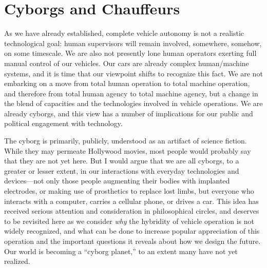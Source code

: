 \chapter{Cyborgs and Chauffeurs}

As we have already established, complete vehicle autonomy is not a
realistic technological goal:  human supervisors will remain involved,
somewhere, somehow, on some timescale. We are also not presently lone
human operators exerting full manual control 
of our vehicles. Our cars are already complex human/machine systems,
and it is time that our viewpoint shifts to recognize this fact. We
are not embarking on a move from total human operation to total
machine operation, and therefore from total human agency to total
machine agency, but a change in the blend of capacities and the
technologies involved in vehicle operations. We are already cyborgs,
and this view has a number of implications for our public and
political engagement with technology.

The cyborg is primarily, publicly, understood as an artifact of science
fiction. While they may permeate Hollywood movies, most people would
probably say that they are not yet here. But I would argue that we are
all cyborgs, to a greater or lesser extent, in our interactions with
everyday technologies and devices---not only those people augmenting
their bodies with implanted electrodes, or making use of prosthetics
to replace lost limbs, but everyone who interacts with a computer,
carries a cellular phone, or drives a car. This idea has received
serious attention and consideration in philosophical circles, and
deserves to be revisited here as we consider \emph{why} the hybridity
of vehicle operation is not widely recognized, and what can be done to
increase popular appreciation of this operation and the important
questions it reveals about how we design the future. Our world is
becoming a ``cyborg planet,'' to an extent many have not yet
realized\cite[p. 64]{ekbia}.

